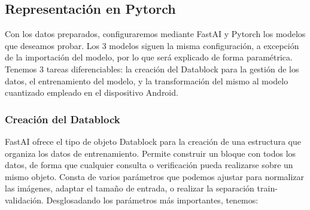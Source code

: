 \subsection{Representación en Pytorch}

Con los datos preparados, configuraremos mediante FastAI y Pytorch los modelos que deseamos probar. Los 3 modelos siguen la misma configuración, a excepción de la importación del modelo, por lo  que será explicado de forma paramétrica. Tenemos 3 tareas diferenciables: la creación del Datablock para la gestión de los datos, el entrenamiento del modelo, y la transformación del mismo al modelo cuantizado empleado en el dispositivo Android.

\subsubsection{Creación del Datablock}

FastAI ofrece el tipo de objeto Datablock para la creación de una estructura que organiza los datos de entrenamiento. Permite construir un bloque con todos los datos, de forma que cualquier consulta o verificación pueda realizarse sobre un mismo objeto. Consta de varios parámetros que podemos ajustar para normalizar las imágenes, adaptar el tamaño de entrada, o realizar la separación train-validación. Desglosadando los parámetros más importantes, tenemos:


